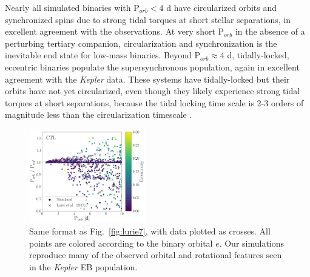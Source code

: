 \documentclass[twocolumn]{aastex61}
\newcommand{\kepler}[0]{\textit{Kepler}\xspace}
\begin{document}
Nearly all simulated binaries with P$_{orb} < 4$ d have circularized orbits and synchronized spins due to strong tidal torques at short stellar separations, in excellent agreement with the \citet{Lurie2017} observations. At very short P$_{orb}$ in the absence of a perturbing tertiary companion, circularization and synchronization is the inevitable end state for low-mass binaries.  Beyond P$_{orb} \approx 4$ d, tidally-locked, eccentric binaries populate the supersynchronous population, again in excellent agreement with the \citet{Lurie2017} \kepler data.  These systems have tidally-locked but their orbits have not yet circularized, even though they likely experience strong tidal torques at short separations, because the tidal locking time scale is 2-3 orders of magnitude less than the circularization timescale \citep{Mazeh2008}.

\begin{figure}
	\includegraphics[width=0.45\textwidth]{../Plots/subsync.pdf}
   \caption{Same format as Fig.~\ref{fig:lurie7}, with \citet{Lurie2017} data plotted as crosses.  All points are colored according to the binary orbital $e$. Our simulations reproduce many of the observed orbital and rotational features seen in the \kepler EB population.}%
    \label{fig:subsync}%
\end{figure}
\end{document}
